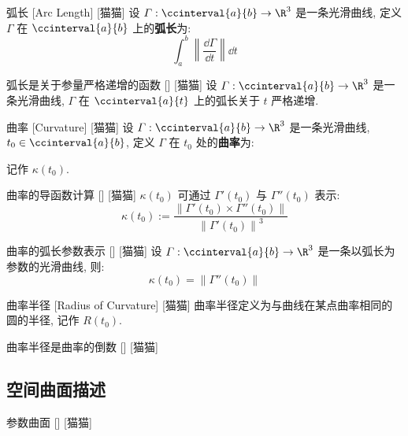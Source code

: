 \documentclass[UTF8]{ctexart}
\begin{document}
			\begin{dfn}
				[]
				{弧长}
				[Arc Length]
				[猫猫]
				设 \(\varGamma:\ccinterval{a}{b}\to\R^3\) 是一条光滑曲线, 定义 \(\varGamma\) 在 \(\ccinterval{a}{b}\) 上的\textbf{弧长}为: 
				\[\int_a^b\left\|\frac{\dd\varGamma}{\dd t}\right\|\dd t\]
			\end{dfn}
			
			\begin{ppt}
				[]
				{弧长是关于参量严格递增的函数}
				[]
				[猫猫]
				设 \(\varGamma:\ccinterval{a}{b}\to\R^3\) 是一条光滑曲线, \(\varGamma\) 在 \(\ccinterval{a}{t}\) 上的弧长关于 \(t\) 严格递增. 
			\end{ppt}
			
			\begin{dfn}
				[]
				{曲率}
				[Curvature]
				[猫猫]
				设 \(\varGamma:\ccinterval{a}{b}\to\R^3\) 是一条光滑曲线, \(t_0\in\ccinterval{a}{b}\), 定义 \(\varGamma\) 在 \(t_0\) 处的\textbf{曲率}为: 

				记作 \(\kappa(t_0)\). 
			\end{dfn}
			
			\begin{ppt}
				[]
				{曲率的导函数计算}
				[]
				[猫猫]
				\(\kappa(t_0)\) 可通过 \(\varGamma'(t_0)\) 与 \(\varGamma''(t_0)\) 表示: 
				\[\kappa(t_0):=\frac{\|\varGamma'(t_0)\times\varGamma''(t_0)\|}{{\|\varGamma'(t_0)\|}^3}\]
			\end{ppt}
			
			\begin{ppt}
				[]
				{曲率的弧长参数表示}
				[]
				[猫猫]
				设 \(\varGamma:\ccinterval{a}{b}\to\R^3\) 是一条以弧长为参数的光滑曲线, 则: 
				\[\kappa(t_0)=\|\varGamma''(t_0)\|\]
			\end{ppt}
			
			\begin{dfn}
				[]
				{曲率半径}
				[Radius of Curvature]
				[猫猫]
				曲率半径定义为与曲线在某点曲率相同的圆的半径, 记作 \(R(t_0)\). 
			\end{dfn}
			
			\begin{ppt}
				[]
				{曲率半径是曲率的倒数}
				[]
				[猫猫]
			\end{ppt}

		\subsection{空间曲面描述}
			
			\begin{dfn}
				[]
				{参数曲面}
				[]
				[猫猫]
			\end{dfn}
			
\end{document}
